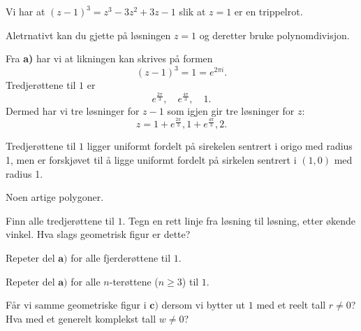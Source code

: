 \begin{losning}

\begin{punkt}
Vi har at $(z-1)^3=z^3-3z^2+3z-1$ slik at $z=1$ er en trippelrot.

\noindent
Aletrnativt kan du gjette på løsningen $z=1$ og deretter bruke polynomdivisjon.
\end{punkt}

\begin{punkt}


Fra \textbf{a)} har vi at likningen kan skrives på formen $$(z-1)^3=1=e^{2\pi i}.$$ Tredjerøttene til $1$ er $$e^{\frac{2\pi}{3}}, \quad e^{\frac{4\pi}{3}},\quad 1.$$ Dermed har vi tre løsninger for $z-1$ som igjen gir tre løsninger for $z$: $$z=1+e^{\frac{2\pi}{3}},1+e^{\frac{4\pi}{3}},2.$$

\noindent
Tredjerøttene til $1$ ligger uniformt fordelt på sirekelen sentrert i origo med radius 1, men er forskjøvet til å ligge uniformt fordelt på sirkelen sentrert i $(1,0)$ med radius 1.


\end{punkt}

\end{losning}

\begin{oppgave}
Noen artige polygoner.
\begin{punkt}
Finn alle tredjerøttene til $1$. Tegn en rett linje fra løsning til løsning, etter økende vinkel.
Hva slags geometrisk figur er dette?
\end{punkt}

\begin{punkt}
Repeter del $\textbf{a)}$ for alle fjerderøttene til $1$.
\end{punkt}


\begin{punkt}
Repeter del $\textbf{a)}$ for alle $n$-terøttene ($n\geq 3$) til $1$.
\end{punkt}

\begin{punkt}
Får vi samme geometriske figur i $\textbf{c)}$ dersom vi bytter ut $1$ med et reelt tall $r \neq 0$?
Hva med et generelt komplekst tall $w\neq 0$?
\end{punkt}
\end{oppgave}



